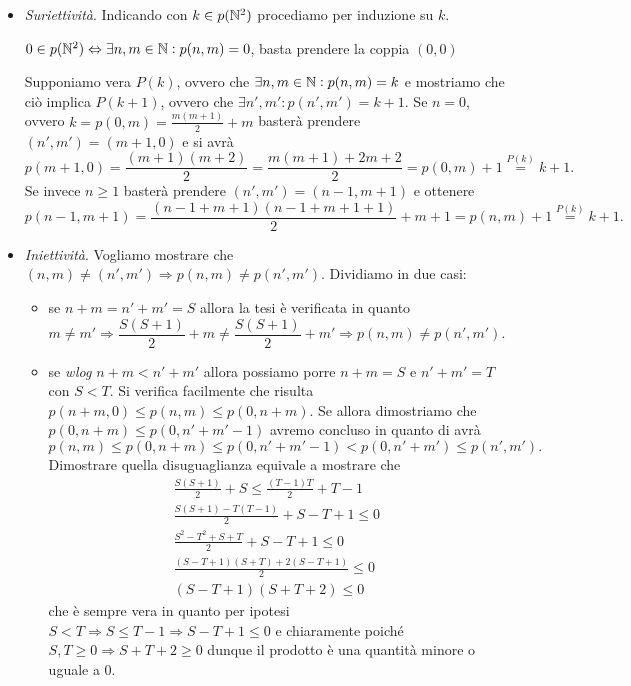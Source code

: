 \begin{itemize}
\item \emph{Suriettività}. Indicando con $ k \in p(\mathbb{N}^2) $ procediamo per induzione su $ k $.
  \begin{pbase}
    $ 0 \in p(\mathbb{N}^2) \Leftrightarrow \exists n, m \in \mathbb{N} : p(n, m) = 0 $, basta prendere la coppia $ (0, 0) $
  \end{pbase}
  \begin{pind}
    Supponiamo vera $ P(k) $, ovvero che $ \exists n, m \in \mathbb{N} : p(n, m) = k $ e mostriamo che ciò implica $ P(k + 1) $, ovvero che $ \exists n', m' : p(n', m') = k + 1 $. Se $ n = 0 $, ovvero $ k = p(0, m) = \frac{m (m + 1)}{2} + m $ basterà prendere $ (n', m') = (m + 1, 0) $ e si avrà \[p(m + 1, 0) = \frac{(m + 1)(m + 2)}{2} = \frac{m (m + 1) + 2m + 2}{2} = p(0, m) + 1 \overset{P(k)}{=} k + 1.\] Se invece $ n \geq 1 $ basterà prendere $ (n', m') = (n - 1, m + 1) $ e ottenere \[p(n - 1, m + 1) = \frac{(n - 1 + m + 1)(n - 1 + m + 1 + 1)}{2} + m + 1 = p(n, m) + 1 \overset{P(k)}{=} k + 1.\]
  \end{pind}
\item \emph{Iniettività}. Vogliamo mostrare che $ (n, m) \neq (n', m') \Rightarrow p(n, m) \neq p(n', m') $. Dividiamo in due casi:
  \begin{itemize}
  \item se $ n + m = n' + m' = S $ allora la tesi è verificata in quanto \[m \neq m' \Rightarrow \frac{S (S + 1)}{2} + m \neq \frac{S (S + 1)}{2} + m' \Rightarrow  p(n, m) \neq p(n', m').\]
  \item se \emph{wlog} $ n + m < n' + m' $ allora possiamo porre $ n + m = S $ e $ n' + m' = T $ con $ S < T $. Si verifica facilmente che risulta $ p(n + m, 0) \leq p(n, m) \leq p(0, n + m) $. Se allora dimostriamo che $ p(0, n + m) \leq p(0, n' + m' - 1) $ avremo concluso in quanto di avrà \[p(n, m) \leq p(0, n + m) \leq p(0, n' + m' - 1) < p(0, n' + m') \leq p(n', m').\] Dimostrare quella disuguaglianza equivale a mostrare che
    \begin{gather*}
      \frac{S(S + 1)}{2} + S \leq \frac{(T - 1)T}{2} + T - 1 \\
      \frac{S(S + 1) - T(T - 1)}{2} + S - T + 1 \leq 0 \\
      \frac{S^2 - T^2 + S + T}{2} + S - T + 1 \leq 0 \\
      \frac{(S - T + 1)(S + T) + 2(S - T + 1)}{2} \leq 0 \\
      (S - T + 1)(S + T + 2) \leq 0
    \end{gather*}
    che è sempre vera in quanto per ipotesi $ S < T \Rightarrow S \leq T - 1 \Rightarrow S - T + 1 \leq 0 $ e chiaramente poiché $ S, T \geq 0 \Rightarrow S + T + 2 \geq 0 $ dunque il prodotto è una quantità minore o uguale a 0.
  \end{itemize}
\end{itemize}
